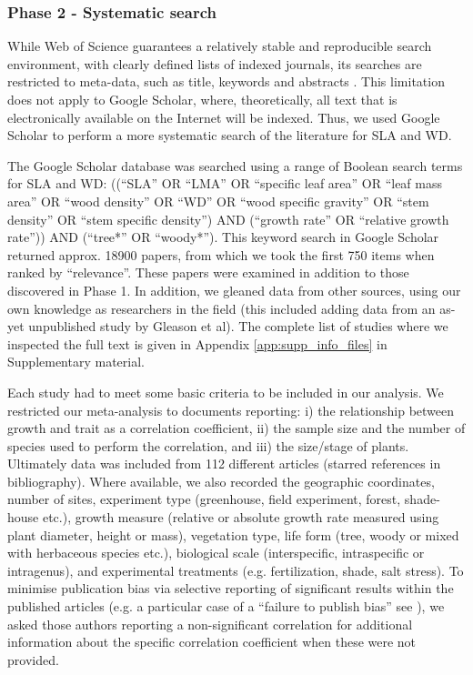 \documentclass[a4paper]{article}\usepackage[]{graphicx}\usepackage[]{color}
\begin{document}
\subsubsection*{Phase 2 - Systematic search}\label{systematic-search}

While Web of Science guarantees a relatively stable and reproducible search environment, with clearly defined lists of indexed journals, its searches are restricted to meta-data, such as title, keywords and abstracts \citep{Beckmann:2012hn}. This limitation does not apply to Google Scholar, where, theoretically, all text that is electronically available on the Internet will be indexed. Thus, we used Google Scholar to perform a more systematic search of the literature for SLA and WD.

The Google Scholar database was searched using a range of Boolean search terms for SLA and WD: ((``SLA'' OR ``LMA'' OR ``specific leaf area'' OR ``leaf mass area'' OR ``wood density'' OR ``WD'' OR ``wood specific gravity'' OR ``stem density'' OR ``stem specific density'') AND (``growth rate'' OR ``relative growth rate'')) AND (``tree*'' OR ``woody*''). This keyword search in Google Scholar returned approx. 18900 papers, from which we took the first 750 items when ranked by ``relevance''.
These papers were examined in addition to those discovered in Phase 1. In addition, we gleaned data from other sources, using our own knowledge as researchers in the field (this included adding data from an as-yet unpublished study by Gleason et al).  The complete list of studies where we inspected the full text is given in Appendix \ref{app:supp_info_files} in Supplementary material.

Each study had to meet some basic criteria to be included in our analysis. We restricted our meta-analysis to documents reporting: i) the relationship between growth and trait as a correlation coefficient, ii) the sample size and the number of species used to perform the correlation, and iii) the size/stage of plants. Ultimately data was included from 112 different articles (starred references in bibliography). Where available, we also recorded the geographic coordinates, number of sites, experiment type (greenhouse, field experiment, forest, shade-house etc.), growth measure (relative or absolute growth rate measured using plant diameter, height or mass), vegetation type, life form (tree, woody or mixed with herbaceous species etc.), biological scale (interspecific, intraspecific or intragenus), and experimental treatments (e.g. fertilization, shade, salt stress). To minimise publication bias via selective reporting of significant results within the published articles (e.g. a particular case of a ``failure to publish bias'' see \citealt{Jennions:2013ta}), we asked those authors reporting a non-significant correlation for additional information about the specific correlation coefficient when these were not provided.
\end{document}
